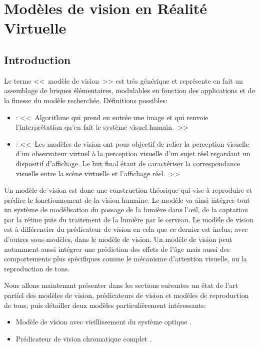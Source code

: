 \part{Modèles de vision en Réalité Virtuelle}
	\chapter*{Introduction}
	\par Le terme <<~modèle de vision~>> est très générique et représente en fait un assemblage de briques élémentaires, modulables en fonction des applications et de la finesse du modèle recherchée. Définitions possibles:
	\begin{itemize}
		\item \citep{moreau_traite_2006}: <<~Algorithme qui prend en entrée une image et qui renvoie l'interprétation qu'en fait le système visuel humain.~>>
		\item \citep{pattanaik_multiscale_1998}: <<~Les modèles de vision ont pour objectif de relier la perception visuelle d'un observateur virtuel à la perception visuelle d'un sujet réel regardant un dispositif d'affichage. Le but final étant de caractériser la correspondance visuelle entre la scène virtuelle et l'affichage réel.~>>
	\end{itemize}
	
	\par Un modèle de vision est donc une construction théorique qui vise à reproduire et prédire le fonctionnement de la vision humaine. Le modèle va ainsi intégrer tout un système de modélisation du passage de la lumière dans l'œil, de la captation par la rétine puis du traitement de la lumière par le cerveau. Le modèle de vision est à différencier du prédicateur de vision en cela que ce dernier est inclus, avec d'autres sous-modèles, dans le modèle de vision. Un modèle de vision peut notamment aussi intégrer une prédiction des effets de l'âge mais aussi des comportements plus spécifiques comme le mécanisme d'attention visuelle, ou la reproduction de tons.
	
	\par Nous allons maintenant présenter dans les sections suivantes un état de l'art partiel des modèles de vision, prédicateurs de vision et modèles de reproduction de tons, puis détailler deux modèles particulièrement intéressants:
	\begin{itemize}
		\item Modèle de vision avec vieillissement du système optique \citep{mantiuk_human_2015}.
		\item Prédicateur de vision chromatique complet \citep{pattanaik_multiscale_1998}.
	\end{itemize}
	
